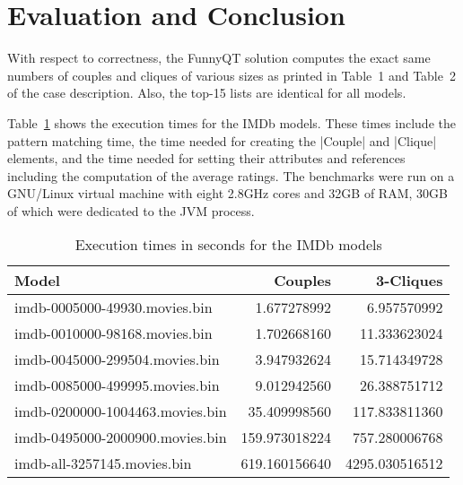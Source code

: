 \documentclass[submission]{eptcs}
\newcommand{\code}{\clojureinline}
\begin{document}
\section{Evaluation and Conclusion}
\label{sec:evaluation}

With respect to correctness, the FunnyQT solution computes the exact same
numbers of couples and cliques of various sizes as printed in Table~1 and
Table~2 of the case description.  Also, the top-15 lists are identical for all
models.

Table~\ref{tab:bench-imdb} shows the execution times for the IMDb models.
These times include the pattern matching time, the time needed for creating the
\code|Couple| and \code|Clique| elements, and the time needed for setting their
attributes and references including the computation of the average ratings.
The benchmarks were run on a GNU/Linux virtual machine with eight 2.8GHz cores
and 32GB of RAM, 30GB of which were dedicated to the JVM process.

\begin{table}[h!tb]
  \footnotesize
  \centering
  \begin{tabular}{| l | r | r |}
    \hline
    \textbf{Model}                  & \textbf{Couples} & \textbf{3-Cliques}\\
    \hline
    imdb-0005000-49930.movies.bin   &   1.677278992    &        6.957570992\\
    imdb-0010000-98168.movies.bin   &   1.702668160    &        11.333623024\\
    imdb-0045000-299504.movies.bin  &   3.947932624    &        15.714349728\\
    imdb-0085000-499995.movies.bin  &   9.012942560    &        26.388751712\\
    imdb-0200000-1004463.movies.bin &   35.409998560   &        117.833811360\\
    imdb-0495000-2000900.movies.bin &   159.973018224  &        757.280006768\\
    imdb-all-3257145.movies.bin     &   619.160156640  &        4295.030516512\\
    \hline
  \end{tabular}
  \caption{Execution times in seconds for the IMDb models}
  \label{tab:bench-imdb}
\end{table}
\end{document}

